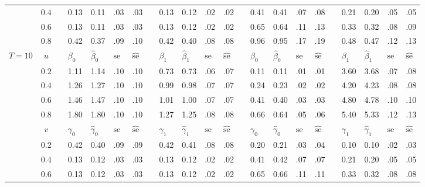 \documentclass[12pt]{article}
\begin{document}
\begin{sidewaystable}
\begin{tabular}{cc
m{0.01cm}m{0.45cm}m{0.45cm}m{0.2cm}m{0.2cm}
m{0.01cm}m{0.45cm}m{0.45cm}m{0.2cm}m{0.2cm}
m{0.01cm}m{0.45cm}m{0.45cm}m{0.2cm}m{0.2cm}
m{0.01cm}m{0.45cm}m{0.45cm}m{0.2cm}m{0.2cm}
}
& $0.4$ && 0.13 & 0.11 & .03 & .03	&& 0.13 & 0.12 & .02 & .02	&& 0.41 & 0.41 & .07 & .08	&& 0.21 & 0.20 & .05 & .05\\
& $0.6$ && 0.13 & 0.11 & .03 & .03	&& 0.13 & 0.12 & .02 & .02	&& 0.65 & 0.64 & .11 & .13	&& 0.33 & 0.32 & .08 & .09\\
& $0.8$ && 0.42 & 0.37 & .09 & .10	&& 0.42 & 0.40 & .08 & .08	&& 0.96 & 0.95 & .17 & .19	&& 0.48 & 0.47 & .12 & .13\\
$T = 10$ & $u$ && 
	$\beta_0$ & $\hat\beta_0$ & $\text{se}$ & $\hat{\text{se}}$ &&
	$\beta_1$ & $\hat\beta_1$ & $\text{se}$ & $\hat{\text{se}}$ &&
	$\beta_0$ & $\hat\beta_0$ & $\text{se}$ & $\hat{\text{se}}$ &&
	$\beta_1$ & $\hat\beta_1$ & $\text{se}$ & $\hat{\text{se}}$\\
\cline{4-7}\cline{9-12}\cline{14-17}\cline{19-22}
& $0.2$ && 1.11 & 1.14 & .10 & .10	&& 0.73 & 0.73 & .06 & .07	&& 0.11 & 0.11 & .01 & .01	&& 3.60 & 3.68 & .07 & .08\\
& $0.4$ && 1.26 & 1.27 & .10 & .10	&& 0.99 & 0.98 & .07 & .07	&& 0.24 & 0.23 & .02 & .02	&& 4.20 & 4.23 & .08 & .08\\
& $0.6$ && 1.46 & 1.47 & .10 & .10	&& 1.01 & 1.00 & .07 & .07	&& 0.41 & 0.40 & .03 & .03	&& 4.80 & 4.78 & .10 & .10\\
& $0.8$ && 1.80 & 1.80 & .10 & .10	&& 1.27 & 1.25 & .08 & .08	&& 0.66 & 0.64 & .05 & .06	&& 5.40 & 5.33 & .12 & .13\\
& $v$ && 
	$\gamma_0$ & $\hat\gamma_0$ & $\text{se}$ & $\hat{\text{se}}$ &&
	$\gamma_1$ & $\hat\gamma_1$ & $\text{se}$ & $\hat{\text{se}}$ &&
	$\gamma_0$ & $\hat\gamma_0$ & $\text{se}$ & $\hat{\text{se}}$ &&
	$\gamma_1$ & $\hat\gamma_1$ & $\text{se}$ & $\hat{\text{se}}$\\
\cline{4-7}\cline{9-12}\cline{14-17}\cline{19-22}
& $0.2$ && 0.42 & 0.40 & .09 & .09	&& 0.42 & 0.41 & .08 & .08	&& 0.20 & 0.21 & .03 & .04	&& 0.10 & 0.10 & .02 & .03\\
& $0.4$ && 0.13 & 0.12 & .03 & .03	&& 0.13 & 0.12 & .02 & .02	&& 0.41 & 0.42 & .07 & .07	&& 0.21 & 0.20 & .05 & .05\\
& $0.6$ && 0.13 & 0.12 & .03 & .03	&& 0.13 & 0.12 & .02 & .02	&& 0.65 & 0.66 & .11 & .11	&& 0.33 & 0.32 & .08 & .08\\

\end{tabular}
\end{sidewaystable}
\end{document}
